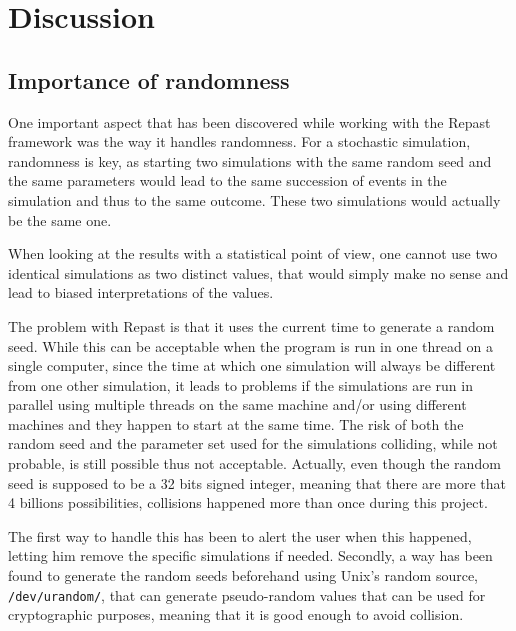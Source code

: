 \documentclass[a4paper,12pt]{report}
\begin{document}
\chapter{Discussion}

\section{Importance of randomness}
One important aspect that has been discovered while working with the Repast framework was the way it handles randomness. For a stochastic simulation, randomness is key, as starting two simulations with the same random seed and the same parameters would lead to the same succession of events in the simulation and thus to the same outcome. These two simulations would actually be the same one.

When looking at the results with a statistical point of view, one cannot use two identical simulations as two distinct values, that would simply make no sense and lead to biased interpretations of the values.

The problem with Repast is that it uses the current time to generate a random seed. While this can be acceptable when the program is run in one thread on a single computer, since the time at which one simulation will always be different from one other simulation, it leads to problems if the simulations are run in parallel using multiple threads on the same machine and/or using different machines and they happen to start at the same time. The risk of both the random seed and the parameter set used for the simulations colliding, while not probable, is still possible thus not acceptable. Actually, even though the random seed is supposed to be a 32 bits signed integer, meaning that there are more that 4 billions possibilities, collisions happened more than once during this project.

The first way to handle this has been to alert the user when this happened, letting him remove the specific simulations if needed. Secondly, a way has been found to generate the random seeds beforehand using Unix's random source, \texttt{/dev/urandom/}, that can generate pseudo-random values that can be used for cryptographic purposes, meaning that it is good enough to avoid collision.

\end{document}
